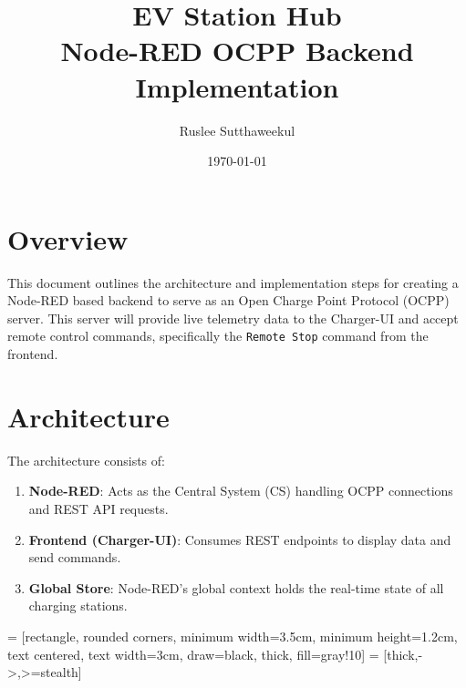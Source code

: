 \documentclass{article}
\title{\textbf{EV Station Hub}\\ Node-RED OCPP Backend Implementation}
\author{Ruslee Sutthaweekul}
\date{\today}
\begin{document}
\maketitle

\section{Overview}
This document outlines the architecture and implementation steps for creating a Node-RED based backend to serve as an Open Charge Point Protocol (OCPP) server. This server will provide live telemetry data to the Charger-UI and accept remote control commands, specifically the \texttt{Remote Stop} command from the frontend.

\section{Architecture}
The architecture consists of:
\begin{enumerate}
    \item \textbf{Node-RED}: Acts as the Central System (CS) handling OCPP connections and REST API requests.
    \item \textbf{Frontend (Charger-UI)}: Consumes REST endpoints to display data and send commands.
    \item \textbf{Global Store}: Node-RED's global context holds the real-time state of all charging stations.
\end{enumerate}

\vspace{0.5cm}

 = [rectangle, rounded corners, minimum width=3.5cm, minimum height=1.2cm, text centered, text width=3cm, draw=black, thick, fill=gray!10]
 = [thick,->,>=stealth]
\end{document}
